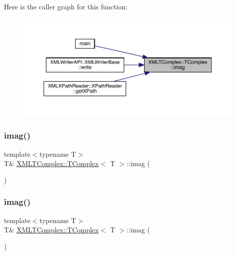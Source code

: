 Here is the caller graph for this function\+:
\nopagebreak
\begin{figure}[H]
\begin{center}
\leavevmode
\includegraphics[width=350pt]{db/dbe/classXMLTComplex_1_1TComplex_af991451a5500d81f96df2a39d70d7196_icgraph}
\end{center}
\end{figure}
\mbox{\label{classXMLTComplex_1_1TComplex_af991451a5500d81f96df2a39d70d7196}} 
\subsubsection{\texorpdfstring{imag()}{imag()}\hspace{0.1cm}{\footnotesize\ttfamily [2/3]}}
{\footnotesize\ttfamily template$<$typename T$>$ \\
T\& \mbox{\hyperlink{classXMLTComplex_1_1TComplex}{X\+M\+L\+T\+Complex\+::\+T\+Complex}}$<$ T $>$\+::imag (\begin{DoxyParamCaption}{ }\end{DoxyParamCaption})\hspace{0.3cm}{\ttfamily [inline]}}

\mbox{\label{classXMLTComplex_1_1TComplex_af991451a5500d81f96df2a39d70d7196}} 
\subsubsection{\texorpdfstring{imag()}{imag()}\hspace{0.1cm}{\footnotesize\ttfamily [3/3]}}
{\footnotesize\ttfamily template$<$typename T$>$ \\
T\& \mbox{\hyperlink{classXMLTComplex_1_1TComplex}{X\+M\+L\+T\+Complex\+::\+T\+Complex}}$<$ T $>$\+::imag (\begin{DoxyParamCaption}{ }\end{DoxyParamCaption})\hspace{0.3cm}{\ttfamily [inline]}}

